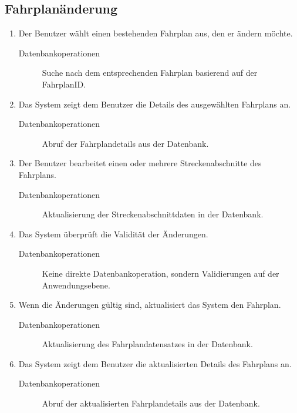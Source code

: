 \subsection{Fahrplanänderung}
\begin{enumerate}
    \item Der Benutzer wählt einen bestehenden Fahrplan aus, den er ändern möchte.
        \begin{description}
            \item[Datenbankoperationen] Suche nach dem entsprechenden Fahrplan basierend auf der FahrplanID. 
        \end{description}
    \item Das System zeigt dem Benutzer die Details des ausgewählten Fahrplans an.
        \begin{description}
            \item[Datenbankoperationen] Abruf der Fahrplandetails aus der Datenbank.
        \end{description}
    \item Der Benutzer bearbeitet einen oder mehrere Streckenabschnitte des Fahrplans.
        \begin{description}
            \item[Datenbankoperationen] Aktualisierung der Streckenabschnittdaten in der
            Datenbank.
        \end{description}
    \item Das System überprüft die Validität der Änderungen.
        \begin{description}
            \item[Datenbankoperationen] Keine direkte Datenbankoperation, sondern Validierungen auf der
            Anwendungsebene.            
        \end{description}
    \item Wenn die Änderungen gültig sind, aktualisiert das System den Fahrplan.
        \begin{description}
            \item[Datenbankoperationen] Aktualisierung des Fahrplandatensatzes in der
            Datenbank.                        
        \end{description}
    \item Das System zeigt dem Benutzer die aktualisierten Details des Fahrplans an.
        \begin{description}
            \item[Datenbankoperationen] Abruf der aktualisierten Fahrplandetails aus der
            Datenbank.                        
        \end{description}
\end{enumerate}
